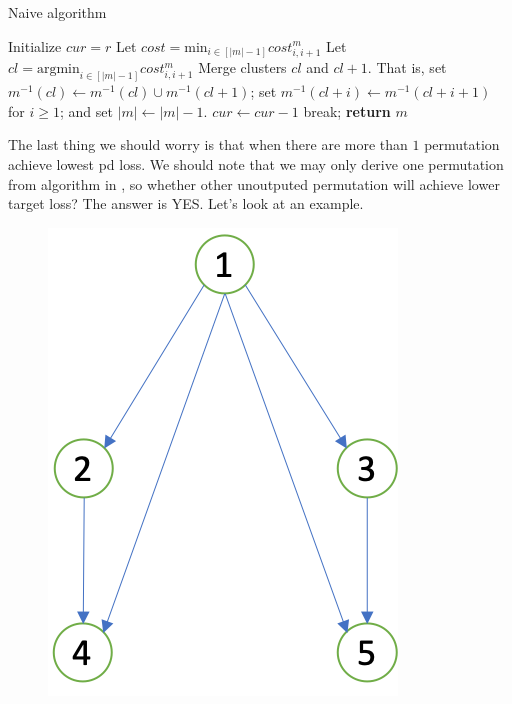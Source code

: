 \begin{algorithm}[H]
	\caption{Naive algorithm}
	\begin{algorithmic}[1]
		\State Initialize $cur=r$
		\State
		Let $cost=\text{min}_{i\in [|m|-1]} cost^m_{i, i+1}$
		\State 
		Let $cl = \text{argmin}_{i\in [|m|-1]} cost^m_{i, i+1}$
		\State Merge clusters $cl$ and $cl+1$. That is, 
		set $m^{-1}(cl)\leftarrow m^{-1}(cl)\cup m^{-1}(cl+1)$; set $m^{-1}(cl+i)\leftarrow m^{-1}(cl+i+1)$ for $i\geq 1$; and set $|m|\leftarrow |m|-1$.
		\State $cur\leftarrow cur-1$
		\Else\quad
			break; 
		\EndIf		
		\EndFor
		\State \textbf{return} $m$
		\EndProcedure
	\end{algorithmic}
\end{algorithm}
The last thing we should worry is that when there are more than $1$ permutation achieve lowest pd loss. We should note that we may only derive one permutation from algorithm in \cite{ramaswamy2013convex}, so whether other unoutputed permutation will achieve lower target loss?  The answer is YES. Let's look at an example.
\begin{figure}[h]
	\begin{center}
\includegraphics[scale=0.5]{figure/eg1.png}
	\end{center}
\end{figure}
